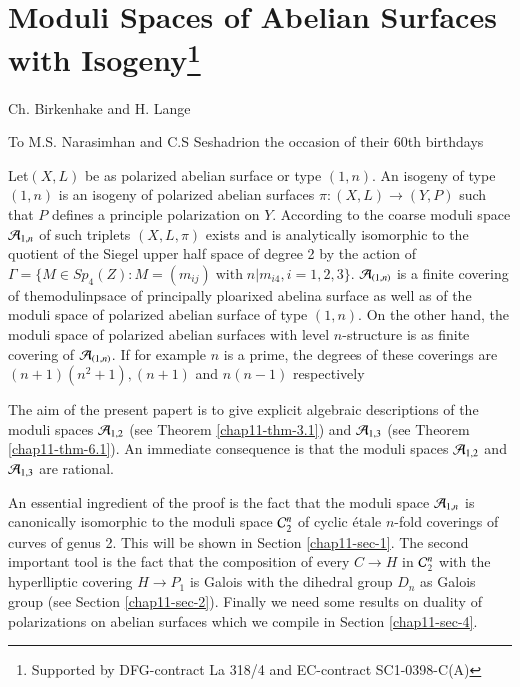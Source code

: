 \chapter[Moduli Spaces of Abelian Surfaces with Isogeny]{Moduli Spaces of Abelian Surfaces with Isogeny\protect\footnote{Supported by DFG-contract La 318/4 and EC-contract SC1-0398-C(A)}}\label{chap11}


\begin{center}
Ch. Birkenhake and H. Lange

\medskip

To M.S. Narasimhan and C.S Seshadri\break on the occasion of their 60th birthdays
\end{center}

Let\pageoriginale $(X, L)$ be as polarized abelian surface or type $(1,n)$. An isogeny of type $(1,n)$ is an isogeny of polarized abelian surfaces $\pi : (X, L)\rightarrow (Y, P)$ such that $P$ defines a principle polarization on $Y$.
According to \cite{chap11-keyH-W} the coarse moduli space $\mathcal{A}_{1,n}$ of such triplets $(X, L, \pi)$ exists and is analytically isomorphic to the quotient of the Siegel upper half space of degree 2 by the action of $\Gamma = \{M \in Sp_{4}(Z): M= (m_{ij}) \;\text{with}\; n|m_{i4}, i= 1,2,3\}$. $\mathcal{A}_{(1,n)}$ is a finite covering of themodulinpsace of principally ploarixed abelina surface as well as of the moduli space of polarized abelian surface of type $(1,n)$. On the other hand, the moduli space of polarized abelian surfaces with level $n$-structure is as finite covering of $\mathcal{A}_{(1,n)}$. If for example $n$ is a prime, the degrees of these coverings are $(n+1)(n^{2}+1), (n+1)$ and $ n(n-1)$ respectively

The aim of the present papert is to give explicit algebraic descriptions of the moduli spaces $\mathcal{A}_{1,2}$ (see Theorem \ref{chap11-thm-3.1}) and $\mathcal{A}_{1,3}$ (see Theorem \ref{chap11-thm-6.1}). An immediate consequence is that the moduli spaces $\mathcal{A}_{1,2}$ and $\mathcal{A}_{1,3}$ are rational.

An essential ingredient of the proof is the fact that the moduli space $\mathcal{A}_{1,n}$ is canonically isomorphic to the moduli space $\mathcal{C}_{2}^{n}$ of cyclic \'etale $n$-fold coverings of curves of genus 2. This will be shown
in Section \ref{chap11-sec-1}. The second important tool is the fact that the composition of every $C \rightarrow H$ in $\mathcal{C}_{2}^{n}$ with the hyperlliptic covering $H \rightarrow P_{1}$ is Galois with the dihedral group $D_{n}$ as Galois group (see Section \ref{chap11-sec-2}). Finally we need some results on duality of polarizations on abelian surfaces which we compile in Section \ref{chap11-sec-4}.

